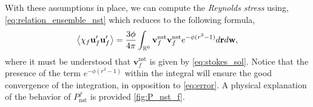 With these assumptions in place, we can compute the \textit{Reynolds stress} using, \ref{eq:relation_ensemble_nst} which reduces to the following formula, 
\begin{equation}
    \avg{\chi_f \textbf{u}_f'\textbf{u}_f'}
    = 
    \frac{3\phi}{4\pi}
    \int_{\mathbb{R}^6}
    \textbf{v}_f^\text{nst}
    \textbf{v}_f^\text{nst}
     e^{-\phi(r^3 -1)}
    d\textbf{r}
    d\textbf{w},
    \label{eq:step_one}
\end{equation}
where it must be understood that $\textbf{v}_f^\text{nst}$ is given by \ref{eq:stokes_sol}. 
Notice that the presence of the term $e^{-\phi(r^3 -1)}$ within the integral will ensure the good convergence of the integration, in opposition to \ref{eq:error}. 
A physical explanation of the behavior of $P_\text{nst}^f$ is provided \ref{fig:P_nst_f}. 
\begin{figure}[h!]
    \centering
{}
\end{figure}

